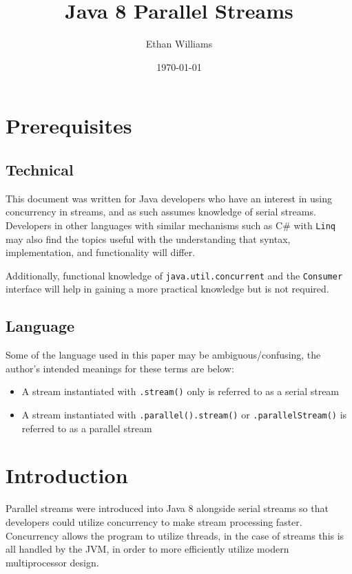 \documentclass[oneside, a4paper, 11pt]{article}
\begin{document}
\title{Java 8 Parallel Streams}
\author{Ethan Williams}
\date{\today}
\maketitle

\tableofcontents

\setcounter{section}{-1}
\section{Prerequisites}
\subsection{Technical}
This document was written for Java developers who have an interest in using concurrency in streams, and as such assumes knowledge of serial streams. Developers in other languages with similar mechanisms such as C\# with \verb|Linq| may also find the topics useful with the understanding that syntax, implementation, and functionality will differ.

Additionally, functional knowledge of \verb|java.util.concurrent| and the \verb|Consumer| interface will help in gaining a more practical knowledge but is not required.
\subsection{Language} \label{language}
Some of the language used in this paper may be ambiguous/confusing, the author's intended meanings for these terms are below:
\begin{itemize}
\item A stream instantiated with \verb|.stream()| only is referred to as a serial stream
\item A stream instantiated with \verb|.parallel().stream()| or \verb|.parallelStream()| is referred to as a parallel stream
\end{itemize}
\section{Introduction} %
Parallel streams were introduced into Java 8 alongside serial streams so that developers could utilize concurrency to make stream processing faster.  Concurrency allows the program to utilize threads, in the case of streams this is all handled by the JVM, in order to more efficiently utilize modern multiprocessor design.
\end{document}
